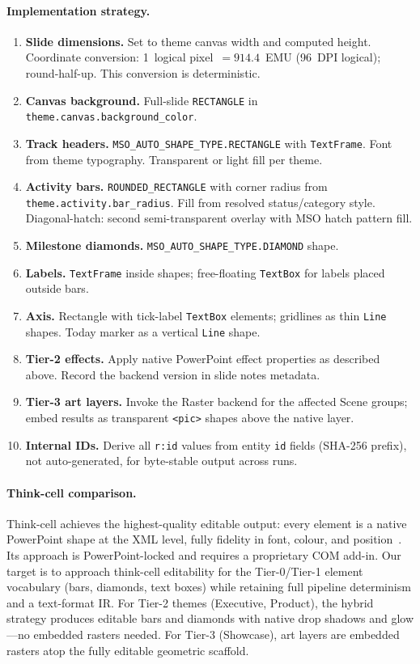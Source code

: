 \paragraph{Implementation strategy.}
\begin{enumerate}
  \item \textbf{Slide dimensions.} Set to theme canvas width and computed height.
        Coordinate conversion: 1~logical pixel~$= 914.4$~EMU (96~DPI logical);
        round-half-up. This conversion is deterministic.
  \item \textbf{Canvas background.} Full-slide \texttt{RECTANGLE} in
        \texttt{theme.canvas.background\_color}.
  \item \textbf{Track headers.} \texttt{MSO\_AUTO\_SHAPE\_TYPE.RECTANGLE} with
        \texttt{TextFrame}. Font from theme typography. Transparent or light fill per theme.
  \item \textbf{Activity bars.} \texttt{ROUNDED\_RECTANGLE} with corner radius from
        \texttt{theme.activity.bar\_radius}. Fill from resolved status/category style.
        Diagonal-hatch: second semi-transparent overlay with MSO hatch pattern fill.
  \item \textbf{Milestone diamonds.} \texttt{MSO\_AUTO\_SHAPE\_TYPE.DIAMOND} shape.
  \item \textbf{Labels.} \texttt{TextFrame} inside shapes; free-floating \texttt{TextBox}
        for labels placed outside bars.
  \item \textbf{Axis.} Rectangle with tick-label \texttt{TextBox} elements; gridlines as
        thin \texttt{Line} shapes. Today marker as a vertical \texttt{Line} shape.
  \item \textbf{Tier-2 effects.} Apply native PowerPoint effect properties as described
        above. Record the backend version in slide notes metadata.
  \item \textbf{Tier-3 art layers.} Invoke the Raster backend for the affected Scene
        groups; embed results as transparent \texttt{<pic>} shapes above the native layer.
  \item \textbf{Internal IDs.} Derive all \texttt{r:id} values from entity \texttt{id}
        fields (SHA-256 prefix), not auto-generated, for byte-stable output across runs.
\end{enumerate}

\paragraph{Think-cell comparison.}
Think-cell achieves the highest-quality editable output: every element is a native
PowerPoint shape at the XML level, fully fidelity in font, colour, and position~\cite{thinkcell}.
Its approach is PowerPoint-locked and requires a proprietary COM add-in. Our target is to
approach think-cell editability for the Tier-0/Tier-1 element vocabulary (bars, diamonds,
text boxes) while retaining full pipeline determinism and a text-format IR. For Tier-2
themes (Executive, Product), the hybrid strategy produces editable bars and diamonds with
native drop shadows and glow---no embedded rasters needed. For Tier-3 (Showcase), art
layers are embedded rasters atop the fully editable geometric scaffold.

